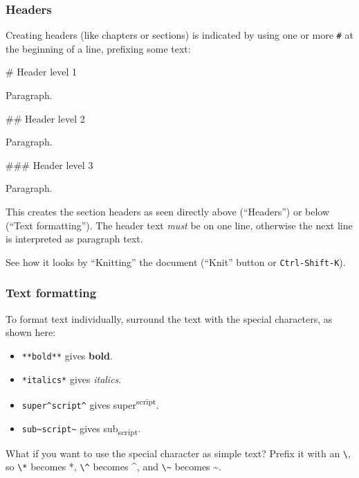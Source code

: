 \documentclass[]{Nemilov}
\newenvironment{Shaded}{\begin{snugshade}}{\end{snugshade}}
\newcommand{\FunctionTok}[1]{\textcolor[rgb]{0.00,0.00,0.00}{#1}}
\newcommand{\NormalTok}[1]{#1}
\providecommand{\tightlist}{%
  \setlength{\itemsep}{0pt}\setlength{\parskip}{0pt}}
\begin{document}
\hypertarget{headers}{%
\subsubsection{Headers}\label{headers}}

Creating headers (like chapters or sections) is indicated by using one or more \texttt{\#}
at the beginning of a line, prefixing some text:

\begin{Shaded}
\begin{Highlighting}[]
\FunctionTok{# Header level 1}

\NormalTok{Paragraph.}

\FunctionTok{## Header level 2}

\NormalTok{Paragraph.}

\FunctionTok{### Header level 3}

\NormalTok{Paragraph.}
\end{Highlighting}
\end{Shaded}

This creates the section headers as seen directly above (``Headers'') or below
(``Text formatting''). The header text \emph{must} be on one line, otherwise the next
line is interpreted as paragraph text.

See how it looks by ``Knitting'' the document (``Knit'' button or \texttt{Ctrl-Shift-K}).

\hypertarget{text-formatting}{%
\subsubsection{Text formatting}\label{text-formatting}}

To format text individually, surround the text with the special characters, as
shown here:

\begin{itemize}
\tightlist
\item
  \texttt{**bold**} gives \textbf{bold}.
\item
  \texttt{*italics*} gives \emph{italics}.
\item
  \texttt{super\^{}script\^{}} gives super\textsuperscript{script}.
\item
  \texttt{sub\textasciitilde{}script\textasciitilde{}} gives sub\textsubscript{script}.
\end{itemize}

What if you want to use the special character as simple text? Prefix it with an \texttt{\textbackslash{}},
so \texttt{\textbackslash{}*} becomes *, \texttt{\textbackslash{}\^{}} becomes \^{}, and \texttt{\textbackslash{}\textasciitilde{}} becomes \textasciitilde{}.
\end{document}
